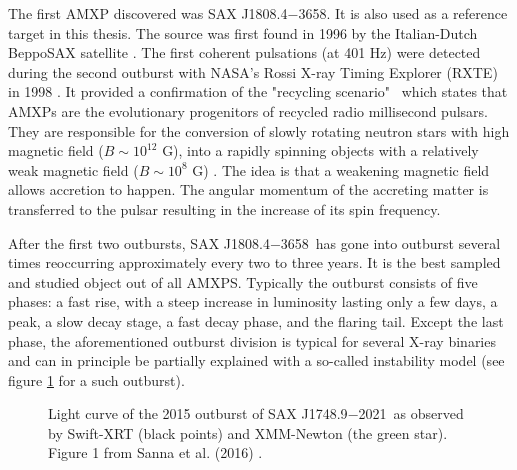 \documentclass{wihuri}
\def\source{SAX J1808.4$-$3658}
\def\sourceb{SAX J1748.9$-$2021}
\begin{document}
The first AMXP discovered was \source. It is also used as a reference target in this thesis. %
The source was first found in 1996 by the Italian-Dutch BeppoSAX satellite \cite{zandsax1808}. %
The first coherent pulsations (at 401 Hz) were detected during the second outburst with NASA's Rossi X-ray Timing Explorer (RXTE) in 1998 \cite{wijnandssax1808}. %
It provided a confirmation of the "recycling scenario" \ which states that AMXPs are the evolutionary progenitors of recycled radio millisecond pulsars. They are responsible for the conversion of slowly rotating neutron stars with high magnetic field ($B \sim 10^{12}$ G), into a rapidly spinning objects with a relatively weak magnetic field ($B \sim 10^{8}$ G) \cite{patruno}. The idea is that a weakening magnetic field allows accretion to happen. The angular momentum of the accreting matter is transferred to the pulsar resulting in the increase of its spin frequency.%



After the first two outbursts, \source \ has gone into outburst several times reoccurring approximately every two to three years. It is the best sampled and studied object out of all AMXPS. Typically the outburst consists of five phases: a fast rise, with a steep increase in luminosity lasting only a few days, a peak, a slow decay stage, a fast decay phase, and the flaring tail. Except the last phase, the aforementioned outburst division is typical for several X-ray binaries and can in principle be partially explained with a so-called instability model \cite{disc-instability} (see figure \ref{fig:outburst} for a such outburst).




\begin{figure}
\centerline{} 
\caption{Light curve of the 2015 outburst of \sourceb \ as observed by Swift-XRT (black points) and XMM-Newton (the green star). Figure 1 from Sanna et al. (2016) \cite{outburst}.}%
\label{fig:outburst}
\end{figure}
\end{document}
